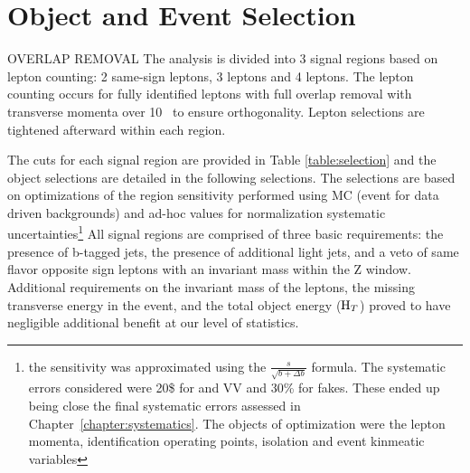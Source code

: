 \chapter[Object and Event Selection][Object and Event Selection]{Object and Event Selection}
\label{chapter:selection}

OVERLAP REMOVAL
The analysis is divided into 3 signal regions based
on lepton counting: 2 same-sign leptons, 3 leptons and 4 leptons. The lepton
counting occurs for fully identified leptons with full overlap removal with
transverse momenta over 10 \gev\ to ensure orthogonality. Lepton selections are tightened
afterward within each region.

The cuts for each signal region are provided in Table \ref{table:selection} and the object selections are detailed in the
following selections. The selections are based on optimizations of the region sensitivity
performed using MC (event for data driven backgrounds) and ad-hoc values for normalization systematic uncertainties\footnote{the sensitivity was approximated using the $\frac{s}{\sqrt{b + \Delta b}}$ formula. The systematic errors considered were 20\$ for \ttV and VV and 30\% for fakes. These ended up being close the final systematic errors assessed in Chapter~\ref{chapter:systematics}. The objects of optimization were the lepton momenta, identification operating points, isolation and event kinmeatic variables} 
All signal regions are comprised of three basic requirements: the presence of b-tagged
jets, the presence of additional light jets, and a veto of same flavor opposite sign leptons with an
invariant mass within the Z window. Additional requirements on the invariant mass of the leptons, the missing transverse energy
in the event, and the total object energy ($\rm H_{T}$) proved to have negligible additional benefit at our level of 
statistics.

